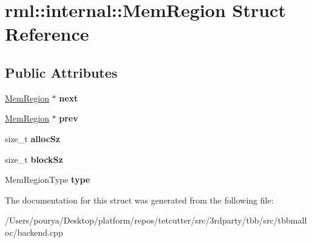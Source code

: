 \hypertarget{structrml_1_1internal_1_1MemRegion}{}\section{rml\+:\+:internal\+:\+:Mem\+Region Struct Reference}
\label{structrml_1_1internal_1_1MemRegion}
\subsection*{Public Attributes}
\begin{DoxyCompactItemize}
\item 
\hypertarget{structrml_1_1internal_1_1MemRegion_aad25a2f9c252b049b8eaf90dcc43e712}{}\hyperlink{structrml_1_1internal_1_1MemRegion}{Mem\+Region} $\ast$ {\bfseries next}\label{structrml_1_1internal_1_1MemRegion_aad25a2f9c252b049b8eaf90dcc43e712}

\item 
\hypertarget{structrml_1_1internal_1_1MemRegion_abfffbf7154918bc0de95ed9d61dc0b9d}{}\hyperlink{structrml_1_1internal_1_1MemRegion}{Mem\+Region} $\ast$ {\bfseries prev}\label{structrml_1_1internal_1_1MemRegion_abfffbf7154918bc0de95ed9d61dc0b9d}

\item 
\hypertarget{structrml_1_1internal_1_1MemRegion_a72fab87e962cf6157a4a521b9c4ca949}{}size\+\_\+t {\bfseries alloc\+Sz}\label{structrml_1_1internal_1_1MemRegion_a72fab87e962cf6157a4a521b9c4ca949}

\item 
\hypertarget{structrml_1_1internal_1_1MemRegion_ad0089db2ba1bdf1366c0fad054ca4a20}{}size\+\_\+t {\bfseries block\+Sz}\label{structrml_1_1internal_1_1MemRegion_ad0089db2ba1bdf1366c0fad054ca4a20}

\item 
\hypertarget{structrml_1_1internal_1_1MemRegion_a35c4ef2cfe2b326c24ed24c7ecabf425}{}Mem\+Region\+Type {\bfseries type}\label{structrml_1_1internal_1_1MemRegion_a35c4ef2cfe2b326c24ed24c7ecabf425}

\end{DoxyCompactItemize}


The documentation for this struct was generated from the following file\+:\begin{DoxyCompactItemize}
\item 
/\+Users/pourya/\+Desktop/platform/repos/tetcutter/src/3rdparty/tbb/src/tbbmalloc/backend.\+cpp\end{DoxyCompactItemize}
